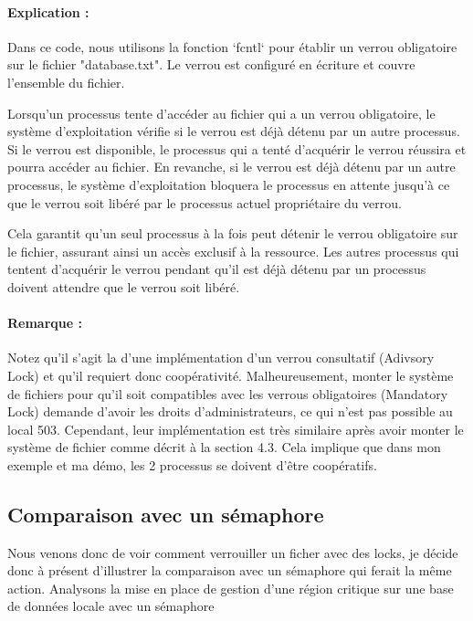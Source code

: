 \paragraph{Explication :}
Dans ce code, nous utilisons la fonction `fcntl` pour établir un verrou obligatoire sur le fichier "database.txt". Le verrou  est configuré en écriture et couvre l'ensemble du fichier. 

Lorsqu'un processus tente d'accéder au fichier qui a un verrou obligatoire, le système d'exploitation vérifie si le verrou est déjà détenu par un autre processus. Si le verrou est disponible, le processus qui a tenté d'acquérir le verrou réussira et pourra accéder au fichier. En revanche, si le verrou est déjà détenu par un autre processus, le système d'exploitation bloquera le processus en attente jusqu'à ce que le verrou soit libéré par le processus actuel propriétaire du verrou.

Cela garantit qu'un seul processus à la fois peut détenir le verrou obligatoire sur le fichier, assurant ainsi un accès exclusif à la ressource. Les autres processus qui tentent d'acquérir le verrou pendant qu'il est déjà détenu par un processus doivent attendre que le verrou soit libéré.

\paragraph{Remarque :} Notez qu'il s'agit la d'une implémentation d'un verrou consultatif (Adivsory Lock) et qu'il requiert donc coopérativité. Malheureusement, monter le système de fichiers pour qu'il soit compatibles avec les verrous obligatoires (Mandatory Lock) demande d'avoir les droits d'administrateurs, ce qui n'est pas possible au local 503. Cependant, leur implémentation est très similaire après avoir monter le système de fichier comme décrit à la section 4.3. Cela implique que dans mon exemple et ma démo, les 2 processus se doivent d'être coopératifs.

\subsection{Comparaison avec un sémaphore}
Nous venons donc de voir comment verrouiller un ficher avec des locks, je décide donc à présent d'illustrer la comparaison avec un sémaphore qui ferait la même action. Analysons la mise en place de gestion d'une région critique sur une base de données locale avec un sémaphore

